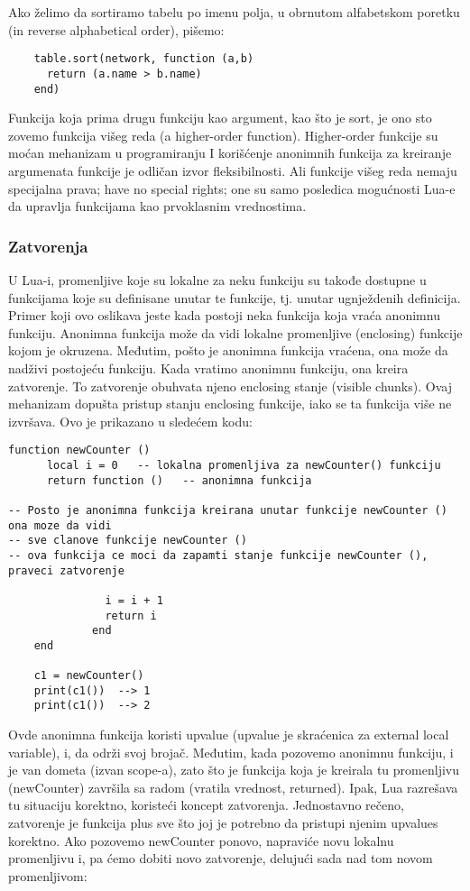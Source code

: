 \documentclass[a4paper]{article}
\begin{document}
Ako želimo da sortiramo tabelu po imenu polja, u obrnutom alfabetskom poretku (in reverse alphabetical order), pišemo:
\begin{verbatim}
    table.sort(network, function (a,b)
      return (a.name > b.name)
    end)
\end{verbatim}
Funkcija koja prima drugu funkciju kao argument, kao što je sort, je ono sto zovemo funkcija višeg reda (a higher-order function). Higher-order funkcije su moćan mehanizam u programiranju I korišćenje anonimnih funkcija za kreiranje argumenata funkcije je odličan izvor fleksibilnosti. Ali funkcije višeg reda nemaju specijalna prava; have no special rights; one su samo posledica mogućnosti Lua-e da upravlja funkcijama kao prvoklasnim vrednostima.

\subsubsection{Zatvorenja}
U Lua-i, promenljive koje su lokalne za neku funkciju su takođe dostupne u funkcijama koje su definisane unutar te funkcije, tj. unutar ugnježdenih definicija. Primer koji ovo oslikava jeste kada postoji neka funkcija koja vraća anonimnu funkciju. Anonimna funkcija može da vidi lokalne promenljive (enclosing) funkcije kojom je okruzena. Međutim, pošto je anonimna funkcija vraćena, ona može da nadživi postojeću funkciju. Kada vratimo anonimnu funkciju, ona kreira zatvorenje. To zatvorenje obuhvata njeno enclosing stanje (visible chunks). Ovaj mehanizam dopušta pristup stanju enclosing funkcije, iako se ta funkcija više ne izvršava. Ovo je prikazano u sledećem kodu:
\begin{verbatim}
function newCounter ()
      local i = 0	-- lokalna promenljiva za newCounter() funkciju
      return function ()   -- anonimna funkcija

-- Posto je anonimna funkcija kreirana unutar funkcije newCounter () ona moze da vidi
-- sve clanove funkcije newCounter ()
-- ova funkcija ce moci da zapamti stanje funkcije newCounter (), praveci zatvorenje

               i = i + 1
               return i
             end
    end
    
    c1 = newCounter()
    print(c1())  --> 1
    print(c1())  --> 2
\end{verbatim}
Ovde anonimna funkcija koristi upvalue (upvalue je skraćenica za external local variable), i, da održi svoj brojač. Međutim, kada pozovemo anonimnu funkciju, i je van dometa (izvan scope-a), zato što je funkcija koja je kreirala tu promenljivu (newCounter) završila sa radom (vratila vrednost, returned). Ipak, Lua razrešava tu situaciju korektno, koristeći koncept zatvorenja. Jednostavno rečeno, zatvorenje je funkcija plus sve što joj je potrebno da pristupi njenim upvalues korektno. Ako pozovemo newCounter ponovo, napraviće novu lokalnu promenljivu i, pa ćemo dobiti novo zatvorenje, delujući sada nad tom novom promenljivom:
\end{document}
